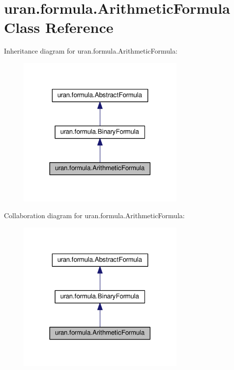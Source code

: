 \hypertarget{classuran_1_1formula_1_1_arithmetic_formula}{}\section{uran.\+formula.\+Arithmetic\+Formula Class Reference}
\label{classuran_1_1formula_1_1_arithmetic_formula}


Inheritance diagram for uran.\+formula.\+Arithmetic\+Formula\+:
\nopagebreak
\begin{figure}[H]
\begin{center}
\leavevmode
\includegraphics[width=233pt]{classuran_1_1formula_1_1_arithmetic_formula__inherit__graph}
\end{center}
\end{figure}


Collaboration diagram for uran.\+formula.\+Arithmetic\+Formula\+:
\nopagebreak
\begin{figure}[H]
\begin{center}
\leavevmode
\includegraphics[width=233pt]{classuran_1_1formula_1_1_arithmetic_formula__coll__graph}
\end{center}
\end{figure}
